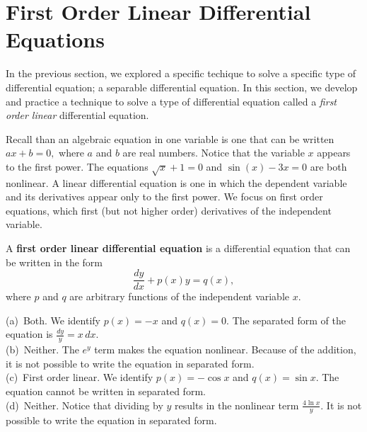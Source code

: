 
\section{First Order Linear Differential Equations}\label{sec:Linear}

In the previous section, we explored a specific techique to solve a specific type of differential equation; a separable differential equation.  In this section, we develop and practice a technique to solve a type of differential equation called a \emph{first order linear} differential equation.

Recall than an algebraic equation in one variable is one that can be written $ax + b = 0,$ where $a$ and $b$ are real numbers.  Notice that the variable $x$ appears to the first power.  The equations $\sqrt{x}+1=0$ and $\sin(x)-3x = 0$ are both nonlinear. A linear differential equation is one in which the dependent variable and its derivatives appear only to the first power.  We focus on first order equations, which first (but not higher order) derivatives of the independent variable.

{A \textbf{first order linear differential equation} is a differential equation that can be written in the form
	\[
	\frac{dy}{dx} + p(x)y = q(x),
	\]
where $p$ and $q$ are arbitrary functions of the independent variable $x$.
}

{(a)\ Both.  We identify $p(x) = -x$ and $q(x) = 0.$  The separated form of the equation is $\displaystyle \frac{dy}{y} = x\,dx.$\\
(b)\ Neither.  The $e^y$ term makes the equation nonlinear.  Because of the addition, it is not possible to write the equation in separated form.\\
(c)\ First order linear.  We identify $p(x) = -\cos x$ and $q(x) = \sin x.$  The equation cannot be written in separated form.\\
(d)\ Neither.  Notice that dividing by $y$ results in the nonlinear term $\displaystyle \frac{4\ln x}{y}.$ It is not possible to write the equation in separated form.
}\\

